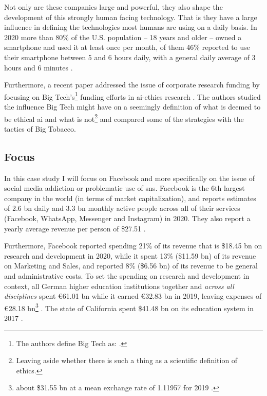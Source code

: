 Not only are these companies large and powerful, they also shape the development of this strongly human facing technology. That is they have a large influence in defining the technologies most humans are using on a daily basis. 
In 2020 more than 80\% of the U.S. population -- 18 years and older -- owned a smartphone and used it at least once per month, of them 46\% reported to use their smartphone between 5 and 6 hours daily, with a general daily average of 3 hours and 6 minutes \citep{odea_us_2021, odea_smartphone_2021, statista_research_department_time_2020}. 

Furthermore, a recent paper addressed the issue of corporate research funding by focusing on Big Tech's\footnote{The authors define Big Tech as:  \citep{abdalla_grey_2021}.} funding efforts in \gls{ai}-ethics research \citep{abdalla_grey_2021}.
The authors studied the influence Big Tech might have on a seemingly  definition of what is deemed to be ethical \gls{ai} and what is not\footnote{Leaving aside whether there is such a thing as a scientific definition of ethics.} and compared some of the strategies with the tactics of Big Tobacco.

\subsection{Focus}
In this case study I will focus on Facebook and more specifically on the issue of social media addiction or problematic use of \gls{sns}.
Facebook is the 6th largest company in the world (in terms of market capitalization), and reports estimates of 2.6 \gls{bn} daily and 3.3 \gls{bn} monthly active people across all of their services (Facebook, WhatsApp, Messenger and Instagram) in 2020.
They also report a yearly average revenue per person of \$27.51 \citep{facebook_inc_annual_2021}.

Furthermore, Facebook reported spending 21\% of its revenue that is \$18.45 \gls{bn} on research and development in 2020, while it spent 13\% (\$11.59 \gls{bn}) of its revenue on Marketing and Sales, and reported 8\% (\$6.56 \gls{bn}) of its revenue to be  general and administrative costs. \citep{facebook_inc_annual_2021}
To set the spending on research and development in context, all German higher education institutions together and \textit{across all disciplines} spent €61.01 \gls{bn} while it earned €32.83 \gls{bn} in 2019, leaving expenses of €28.18 \gls{bn}\footnote{about \$31.55 \gls{bn} at a mean exchange rate of 1.11957 for 2019 \citep{estv_jahresmittelkurse_2021} .} \citep{statistisches_bundesamt_ausgaben_2021, statistisches_bundesamt_einnahmen_2021}. The state of California spent \$41.48 \gls{bn} on its education system in 2017 \citep{duffin_us_2020}.

